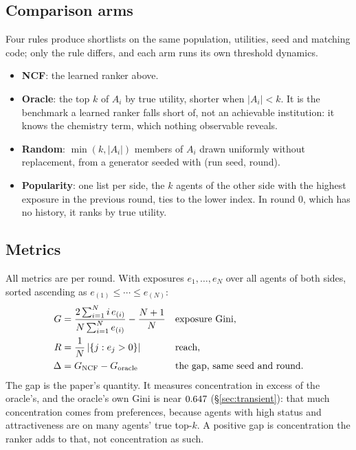 \subsection{Comparison arms}
\label{sec:arms}

Four rules produce shortlists on the same population, utilities, seed and
matching code; only the rule differs, and each arm runs its own threshold
dynamics.
\begin{itemize}
\item \textbf{NCF}: the learned ranker above.
\item \textbf{Oracle}: the top $k$ of $A_i$ by true utility, shorter when
  $|A_i| < k$. It is the benchmark a learned ranker falls short of, not an
  achievable institution: it knows the chemistry term, which nothing observable
  reveals.
\item \textbf{Random}: $\min(k, |A_i|)$ members of $A_i$ drawn uniformly without
  replacement, from a generator seeded with (run seed, round).
\item \textbf{Popularity}: one list per side, the $k$ agents of the other side
  with the highest exposure in the previous round, ties to the lower index. In
  round 0, which has no history, it ranks by true utility.
\end{itemize}

\subsection{Metrics}
\label{sec:metrics}

All metrics are per round. With exposures $e_1, \ldots, e_N$ over all agents of
both sides, sorted ascending as $e_{(1)} \le \cdots \le e_{(N)}$:
\begin{align}
G &= \frac{2 \sum_{i=1}^{N} i\, e_{(i)}}{N \sum_{i=1}^{N} e_{(i)}} - \frac{N+1}{N}
  && \text{exposure Gini,} \label{eq:gini}\\
R &= \frac{1}{N} \left| \{ j : e_j > 0 \} \right|
  && \text{reach,} \notag\\
\Delta &= G_{\mathrm{NCF}} - G_{\mathrm{oracle}}
  && \text{the gap, same seed and round.} \notag
\end{align}
The gap is the paper's quantity. It measures concentration in excess of the
oracle's, and the oracle's own Gini is near $0.647$
(\S\ref{sec:transient}): that much concentration comes from preferences, because
agents with high status and attractiveness are on many agents' true top-$k$. A
positive gap is concentration the ranker adds to that, not concentration as
such.

